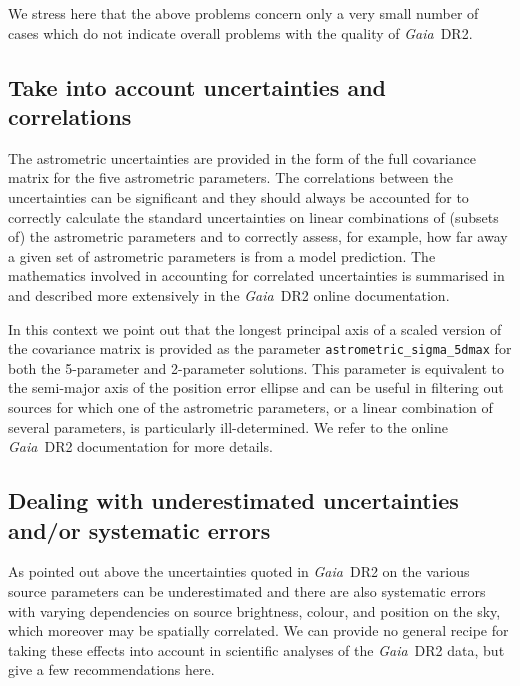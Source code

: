 \documentclass[longauth]{aa_gaia} %
\newcommand\gaia{\textit{Gaia}}
\newcommand\gdr[1]{\gaia~DR#1}
\begin{document}
We stress here that the above problems concern only a very small number of cases which do not
indicate overall problems with the quality of \gdr{2}.

\subsection{Take into account uncertainties and correlations}

The astrometric uncertainties are provided in the form of the full covariance matrix for the five
astrometric parameters. The correlations between the uncertainties can be significant and they
should always be accounted for to correctly calculate the standard uncertainties on linear
combinations of (subsets of) the astrometric parameters and to correctly assess, for example, how
far away a given set of astrometric parameters is from a model prediction. The mathematics involved
in accounting for correlated uncertainties is summarised in \cite{DR2-DPACP-38} and described more
extensively in the \gdr{2} online documentation.

In this context we point out that the longest principal axis of a scaled version of the covariance
matrix is provided as the parameter \texttt{astrometric\_sigma\_5dmax} for both the 5-parameter and
2-parameter solutions. This parameter is equivalent to the semi-major axis of the position error
ellipse and can be useful in filtering out sources for which one of the astrometric parameters, or a
linear combination of several parameters, is particularly ill-determined. We refer to the online
\gdr{2} documentation for more details.

\subsection{Dealing with underestimated uncertainties and/or systematic errors}

As pointed out above the uncertainties quoted in \gdr{2} on the various source parameters can be
underestimated and there are also systematic errors with varying dependencies on source brightness,
colour, and position on the sky, which moreover may be spatially correlated. We can provide no
general recipe for taking these effects into account in scientific analyses of the \gdr{2} data,
but give a few recommendations here.
\end{document}
